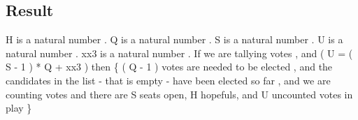 \subsection{Result}
\begin{texto2}
	H is a natural number . Q is a natural number . S is a natural number . U is a natural number . xx3 is a natural number . If we are tallying votes , and ( U = ( S - 1 ) * Q + xx3 ) then \{ ( Q - 1 ) votes are needed to be elected , and the candidates in the list - that is empty - have been elected so far , and we are counting votes and there are S seats open, H hopefuls, and U uncounted votes in play \}
\end{texto2}